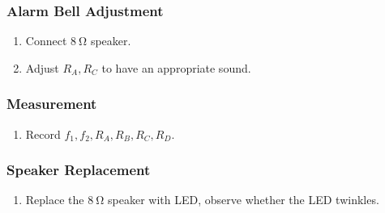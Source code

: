 \documentclass[12pt, a4paper]{article}
\begin{document}
\subsubsection{Alarm Bell Adjustment}
\begin{enumerate}
\item Connect $\SI{8}\ohm$ speaker.
\item Adjust $R_A, R_C$ to have an appropriate sound.
\end{enumerate}

\subsubsection{Measurement}
\begin{enumerate}
\item Record $f_1, f_2, R_A, R_B, R_C, R_D$.
\end{enumerate}

\subsubsection{Speaker Replacement}
\begin{enumerate}
\item Replace the $\SI{8}\ohm$ speaker with LED, observe 
  whether the LED twinkles.
\end{enumerate}
\end{document}
